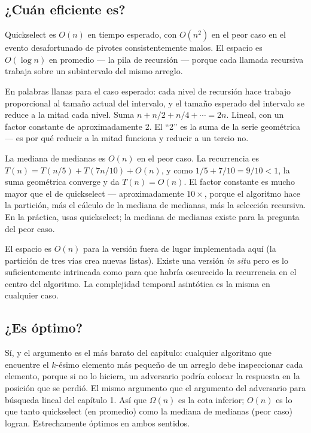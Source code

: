 \documentclass[11pt,a4paper]{article}
\begin{document}
\subsection*{¿Cuán eficiente es?}

Quickselect es $O(n)$ en tiempo esperado, con $O(n^2)$ en el peor caso en el evento desafortunado de pivotes consistentemente malos. El espacio es $O(\log n)$ en promedio --- la pila de recursión --- porque cada llamada recursiva trabaja sobre un subintervalo del mismo arreglo.

En palabras llanas para el caso esperado: cada nivel de recursión hace trabajo proporcional al tamaño actual del intervalo, y el tamaño esperado del intervalo se reduce a la mitad cada nivel. Suma $n + n/2 + n/4 + \cdots = 2n$. Lineal, con un factor constante de aproximadamente 2. El ``2'' es la suma de la serie geométrica --- es por qué reducir a la mitad funciona y reducir a un tercio no.

La mediana de medianas es $O(n)$ en el peor caso. La recurrencia es $T(n) = T(n/5) + T(7n/10) + O(n)$, y como $1/5 + 7/10 = 9/10 < 1$, la suma geométrica converge y da $T(n) = O(n)$. El factor constante es mucho mayor que el de quickselect --- aproximadamente $10\times$, porque el algoritmo hace la partición, más el cálculo de la mediana de medianas, más la selección recursiva. En la práctica, usas quickselect; la mediana de medianas existe para la pregunta del peor caso.

El espacio es $O(n)$ para la versión fuera de lugar implementada aquí (la partición de tres vías crea nuevas listas). Existe una versión \emph{in situ} pero es lo suficientemente intrincada como para que habría oscurecido la recurrencia en el centro del algoritmo. La complejidad temporal asintótica es la misma en cualquier caso.

\subsection*{¿Es óptimo?}

Sí, y el argumento es el más barato del capítulo: cualquier algoritmo que encuentre el $k$-ésimo elemento más pequeño de un arreglo debe inspeccionar cada elemento, porque si no lo hiciera, un adversario podría colocar la respuesta en la posición que se perdió. El mismo argumento que el argumento del adversario para búsqueda lineal del capítulo 1. Así que $\Omega(n)$ es la cota inferior; $O(n)$ es lo que tanto quickselect (en promedio) como la mediana de medianas (peor caso) logran. Estrechamente óptimos en ambos sentidos.
\end{document}
